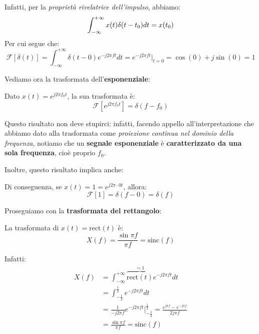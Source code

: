 Infatti, per la \textit{proprietà rivelatrice dell'impulso}, abbiamo:
\[
    \int_{-\infty}^{+\infty} x(t)\delta(t-t_{0})dt = x(t_{0}) \\ \\
\] 
Per cui segue che:
\[
    \mathcal{F}[\delta(t)] = \int_{-\infty}^{+\infty} \delta(t-0) e^{-j 2\pi ft} dt
    = e^{-j 2 \pi ft}\bigg|_{t=0} = \cos(0) +j \sin(0) = 1
\]

Vediamo ora la trasformata dell'\textbf{esponenziale}:

\begin{prop}
    Dato $x(t) = e^{j 2\pi f_{0}t}$, la sua trasformata è:
    \[
        \mathcal{F}\left[ e^{j 2\pi f_{0}t} \right] = \delta(f-f_{0})
    \]
\end{prop}

Questo risultato non deve stupirci: infatti, facendo appello all'interpretazione
che abbiamo dato alla trasformata come \textit{proiezione continua nel dominio della frequenza},
notiamo che un \textbf{segnale esponenziale} è \textbf{caratterizzato da una sola frequenza}, cioè
proprio $f_{0}$.

Inoltre, questo risultato implica anche:

\begin{prop}
    Di conseguenza, se $x(t)= 1 = e^{j 2\pi\cdot 0t}$, allora:
    \[
        \mathcal{F}[1] = \delta(f-0) = \delta(f)
    \] 
\end{prop}

Proseguiamo con la \textbf{trasformata del rettangolo}:

\begin{prop}
    La trasformata di $x(t)=\text{rect}(t)$ è:
    \[
        X(f) = \frac{\sin \pi f}{\pi f} = \text{sinc}(f)
    \] 
\end{prop}

Infatti:
\[   
    \begin{aligned}
        X(f) &= \int_{-\infty}^{+\infty} \overbrace{\text{rect}(t)}^{=1} 
        e^{-j 2\pi ft}dt \\ 
             &= \int_{-\frac{1}{2}}^{\frac{1}{2}} e^{-j 2\pi ft}dt \\
             &= \frac{1}{-j 2\pi f} e^{-j 2\pi ft}\bigg|_{-\frac{1}{2}}^{\frac{1}{2}}
             = \frac{e^{j\pi f} - e^{-j\pi f}}{2j \pi f} \\
             &= \frac{\sin \pi f}{\pi f} = \text{sinc}(f)
    \end{aligned}
\]

